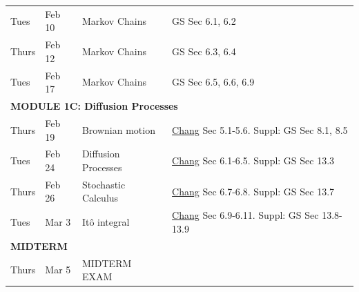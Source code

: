 \documentclass[letterpaper]{inzane_syllabus} %
\begin{document}
\begin{center}
\begin{tabularx}{\textwidth}{p{2cm}p{2cm}p{8cm}p{8cm}}
Tues & Feb 10 & Markov Chains & GS Sec  6.1, 6.2 \\
Thurs & Feb 12 & Markov Chains & GS Sec  6.3, 6.4 \\
Tues & Feb 17 & Markov Chains & GS  Sec  6.5, 6.6, 6.9  \\
\hline
\multicolumn{4}{l}{\textbf{\textcolor{myCOLOR}{\large MODULE 1C: Diffusion Processes}}} \\
\hline
Thurs & Feb 19 & Brownian motion &  \href{http://www.stat.yale.edu/~pollard/Courses/251.spring2013/Handouts/Chang-notes.pdf}{Chang} Sec 5.1-5.6. Suppl: GS Sec  8.1, 8.5\\
Tues & Feb 24 & Diffusion Processes & \href{http://www.stat.yale.edu/~pollard/Courses/251.spring2013/Handouts/Chang-notes.pdf}{Chang} Sec 6.1-6.5. Suppl:  GS Sec 13.3 \\
Thurs & Feb 26 & Stochastic Calculus & \href{http://www.stat.yale.edu/~pollard/Courses/251.spring2013/Handouts/Chang-notes.pdf}{Chang} Sec 6.7-6.8. Suppl:  GS Sec  13.7\\
Tues & Mar 3 & It\^{o} integral & \href{http://www.stat.yale.edu/~pollard/Courses/251.spring2013/Handouts/Chang-notes.pdf}{Chang} Sec 6.9-6.11. Suppl: GS Sec  13.8-13.9  \\
\hline
\multicolumn{4}{l}{\textbf{\textcolor{myCOLOR}{\large MIDTERM}}} \\
\hline

Thurs & Mar 5 & MIDTERM EXAM & \\


\end{tabularx}
\end{center}
\end{document}
